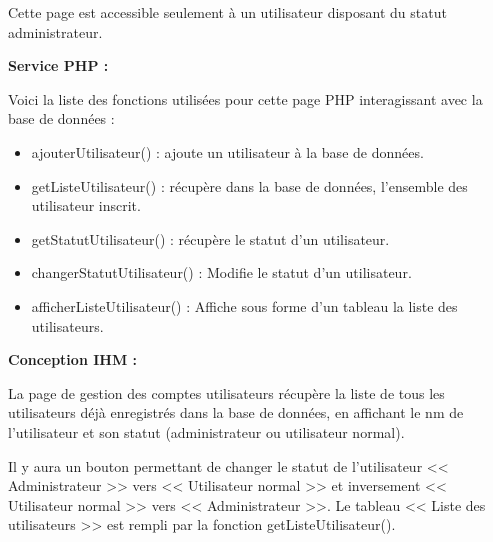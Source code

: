 			\begin{paragraphe}
				Cette page est accessible seulement à un utilisateur disposant du statut administrateur.
			\end{paragraphe}

			\begin{paragraphe}
				\textbf{Service PHP :}
			\end{paragraphe}

			\begin{paragraphe}
				Voici la liste des fonctions utilisées pour cette page PHP interagissant avec la base de données :
				\begin{itemize}
					\item ajouterUtilisateur() : ajoute un utilisateur à la base de données.
					\item getListeUtilisateur() : récupère dans la base de données, l'ensemble des utilisateur inscrit.
					\item getStatutUtilisateur() : récupère le statut d'un utilisateur.
					\item changerStatutUtilisateur() : Modifie le statut d'un utilisateur.
					\item afficherListeUtilisateur() : Affiche sous forme d'un tableau la liste des utilisateurs.
				\end{itemize}
			\end{paragraphe}

			\begin{paragraphe}
				\textbf{Conception IHM :}
			\end{paragraphe}

			\begin{paragraphe}
				La page de gestion des comptes utilisateurs récupère la liste de tous les utilisateurs déjà enregistrés dans la base de données, en affichant le nm de l'utilisateur et son statut (administrateur ou utilisateur normal).
			\end{paragraphe}

			\begin{paragraphe}
				Il y aura un bouton permettant de changer le statut de l'utilisateur << Administrateur >> vers << Utilisateur normal >> et inversement << Utilisateur normal >> vers << Administrateur >>. Le tableau << Liste des utilisateurs >> est rempli par la fonction getListeUtilisateur().
			\end{paragraphe}


